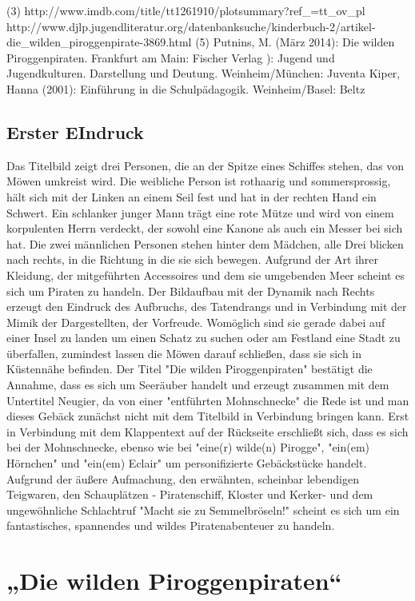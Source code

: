 (3)
http://www.imdb.com/title/tt1261910/plotsummary?ref_=tt_ov_pl
http://www.djlp.jugendliteratur.org/datenbanksuche/kinderbuch-2/artikel-die_wilden_piroggenpirate-3869.html
(5) Putnins, M. (März 2014): Die wilden Piroggenpiraten. Frankfurt am Main: Fischer Verlag
): Jugend und Jugendkulturen. Darstellung und Deutung. 
Weinheim/München: Juventa
Kiper, Hanna (2001): Einführung in die Schulpädagogik. Weinheim/Basel: Beltz

\section{Erster EIndruck}
Das Titelbild zeigt drei Personen, die an der Spitze eines Schiffes stehen, das von Möwen umkreist wird. Die weibliche Person ist rothaarig und sommersprossig, hält sich mit der Linken an einem Seil fest und hat in der rechten Hand ein Schwert. Ein schlanker junger Mann trägt eine rote Mütze und wird von einem korpulenten Herrn verdeckt, der sowohl eine Kanone als auch ein Messer bei sich hat. Die zwei männlichen Personen stehen hinter dem Mädchen, alle Drei blicken nach rechts, in die Richtung in die sie sich bewegen. Aufgrund der Art ihrer Kleidung, der mitgeführten Accessoires und dem sie umgebenden Meer scheint es sich um Piraten zu handeln. Der Bildaufbau mit der Dynamik nach Rechts erzeugt den Eindruck des Aufbruchs, des Tatendrangs und in Verbindung mit der Mimik der Dargestellten, der Vorfreude. Womöglich sind sie gerade dabei auf einer Insel zu landen um einen Schatz zu suchen oder am Festland eine Stadt zu überfallen, zumindest lassen die Möwen darauf schließen, dass sie sich in Küstennähe befinden.
Der Titel "Die wilden Piroggenpiraten" bestätigt die Annahme, dass es sich um Seeräuber handelt und erzeugt zusammen mit dem Untertitel Neugier, da von einer "entführten Mohnschnecke" die Rede ist und man dieses Gebäck zunächst nicht mit dem Titelbild in Verbindung bringen kann. Erst in Verbindung mit dem Klappentext auf der Rückseite erschließt sich, dass es sich bei der Mohnschnecke, ebenso wie bei "eine(r) wilde(n) Pirogge", "ein(em) Hörnchen" und "ein(em) Eclair" um personifizierte Gebäckstücke handelt. Aufgrund der äußere Aufmachung, den erwähnten, scheinbar lebendigen Teigwaren, den Schauplätzen - Piratenschiff, Kloster und Kerker- und dem ungewöhnliche Schlachtruf "Macht sie zu Semmelbröseln!" scheint es sich um ein fantastisches, spannendes und wildes Piratenabenteuer zu handeln.

\chapter{„Die wilden Piroggenpiraten“}

